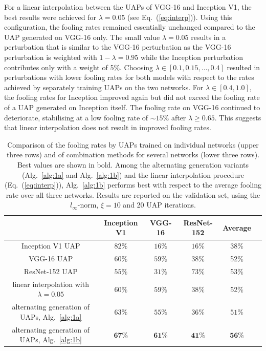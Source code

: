 \documentclass[runningheads]{llncs}
\begin{document}
For a linear interpolation between the UAPs of VGG-16 and Inception V1, the best results were achieved for \(\lambda=0.05\) (see Eq.~(\ref{eq:interp})). Using this configuration, the fooling rates remained essentially unchanged compared to the UAP generated on VGG-16 only.
The small value \(\lambda=0.05\) results in a perturbation that is similar to the VGG-16 perturbation as the VGG-16 perturbation is weighted with \(1-\lambda=0.95\) while the Inception perturbation contributes only with a weight of 5\%. Choosing \(\lambda\in\left[0.1,0.15,\ldots,0.4\right]\) resulted in perturbations with lower fooling rates for both models with respect to the rates achieved by separately training UAPs on the two networks. For \(\lambda \in\left[0.4,1.0\right]\), the fooling rates for Inception improved again but did not exceed the fooling rate of a UAP generated on Inception itself. The fooling rate on VGG-16 continued to deteriorate, stabilising at a low fooling rate of \(\sim 15\%\) after \(\lambda\geq 0.65\). This suggests that linear interpolation does not result in improved fooling rates.
\begin{table}
\centering
\caption{Comparison of the fooling rates by UAPs trained on individual networks (upper three rows) and of combination methods for several networks (lower three rows). Best values are shown in bold. Among the alternating generation variants (Alg.~\ref{alg:1a} and Alg.~\ref{alg:1b}) and the linear interpolation procedure (Eq.~(\ref{eq:interp})), Alg.~\ref{alg:1b} performs best with respect to the average fooling rate over all three networks. Results are reported on the validation set, using the $l_\infty$-norm, $\xi=10$ and 20 UAP iterations.}\label{tab:vergleich_comb}
\begin{tabular}{|c|c|c|c|c|c|}
\hline
											&	Inception	V1&	VGG-16		&	ResNet-152	& Average	\\ \hline
Inception V1 UAP							&	\(82\%\)		&	\(16\%\)	&	\(16\%\)	&38\%	\\
VGG-16 UAP								&	\(60\%\)		&	\(59\%\)	&	\(38\%\)	&52\%	\\
ResNet-152 UAP &	\(55\%\)		&	\(31\%\)	&	\(73\%\)&53\%		\\ \hline
linear interpolation with \(\lambda=0.05\)	&	\(60\%\)		&	\(59\%\)	&	\(38\%\)	&52\%\\
alternating generation of UAPs, Alg.~\ref{alg:1a}&	\(63\%\)		&	\(55\%\)	&	\(36\%\)	& \(51\%\)	\\
alternating generation of UAPs, Alg.~\ref{alg:1b}&	\(\mathbf{67}\%\)		&	\(\mathbf{61}\%\)	&	\(\mathbf{41}\%\)		&\(\mathbf{56}\)\%\\
\hline 
\end{tabular}
\end{table}
\end{document}
